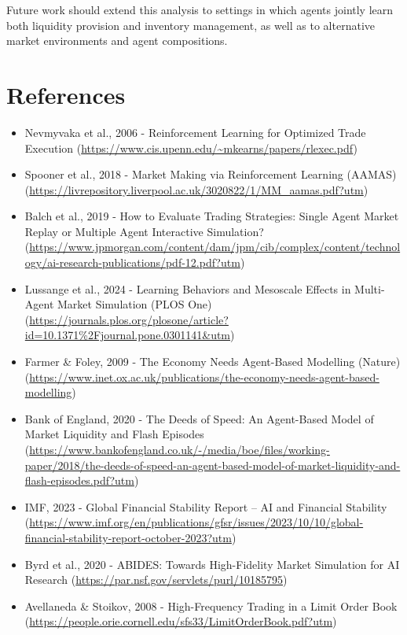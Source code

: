 \documentclass[sigconf]{acmart}
\begin{document}
Future work should extend this analysis to settings in which agents jointly learn both liquidity provision and inventory management, as well as to alternative market environments and agent compositions.

\section*{References}

\begin{itemize}[leftmargin=2em]
    \item Nevmyvaka et al., 2006 - Reinforcement Learning for Optimized Trade Execution (\url{https://www.cis.upenn.edu/~mkearns/papers/rlexec.pdf})

    \item Spooner et al., 2018 - Market Making via Reinforcement Learning (AAMAS) (\url{https://livrepository.liverpool.ac.uk/3020822/1/MM_aamas.pdf?utm})

    \item Balch et al., 2019 - How to Evaluate Trading Strategies: Single Agent Market Replay or Multiple Agent Interactive Simulation? (\url{https://www.jpmorgan.com/content/dam/jpm/cib/complex/content/technology/ai-research-publications/pdf-12.pdf?utm})

    \item Lussange et al., 2024 - Learning Behaviors and Mesoscale Effects in Multi-Agent Market Simulation (PLOS One) (\url{https://journals.plos.org/plosone/article?id=10.1371\%2Fjournal.pone.0301141&utm})

    \item Farmer \& Foley, 2009 - The Economy Needs Agent-Based Modelling (Nature) (\url{https://www.inet.ox.ac.uk/publications/the-economy-needs-agent-based-modelling})

    \item Bank of England, 2020 - The Deeds of Speed: An Agent-Based Model of Market Liquidity and Flash Episodes (\url{https://www.bankofengland.co.uk/-/media/boe/files/working-paper/2018/the-deeds-of-speed-an-agent-based-model-of-market-liquidity-and-flash-episodes.pdf?utm})

    \item IMF, 2023 - Global Financial Stability Report -- AI and Financial Stability (\url{https://www.imf.org/en/publications/gfsr/issues/2023/10/10/global-financial-stability-report-october-2023?utm})

    \item Byrd et al., 2020 - ABIDES: Towards High-Fidelity Market Simulation for AI Research (\url{https://par.nsf.gov/servlets/purl/10185795})

    \item Avellaneda \& Stoikov, 2008 - High-Frequency Trading in a Limit Order Book (\url{https://people.orie.cornell.edu/sfs33/LimitOrderBook.pdf?utm})
\end{itemize}
\end{document}
